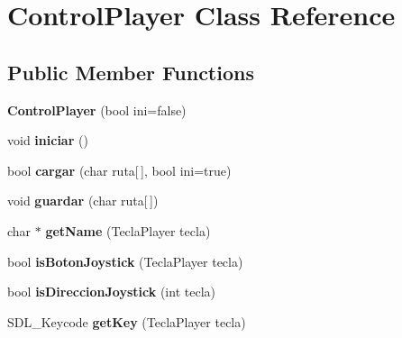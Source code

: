 \hypertarget{class_control_player}{}\section{Control\+Player Class Reference}
\label{class_control_player}
\subsection*{Public Member Functions}
\begin{DoxyCompactItemize}
\item 
{\bfseries Control\+Player} (bool ini=false)\hypertarget{class_control_player_ac3d7c8aa756e72ead84ca6f50f2821fa}{}\label{class_control_player_ac3d7c8aa756e72ead84ca6f50f2821fa}

\item 
void {\bfseries iniciar} ()\hypertarget{class_control_player_a0d545211221da7c7d908520f0f0a9b73}{}\label{class_control_player_a0d545211221da7c7d908520f0f0a9b73}

\item 
bool {\bfseries cargar} (char ruta\mbox{[}$\,$\mbox{]}, bool ini=true)\hypertarget{class_control_player_aaf328fa930e99fc4b3c6b3130c08e0a3}{}\label{class_control_player_aaf328fa930e99fc4b3c6b3130c08e0a3}

\item 
void {\bfseries guardar} (char ruta\mbox{[}$\,$\mbox{]})\hypertarget{class_control_player_a163aa08d30f28910bbd1c2598acfef1b}{}\label{class_control_player_a163aa08d30f28910bbd1c2598acfef1b}

\item 
char $\ast$ {\bfseries get\+Name} (Tecla\+Player tecla)\hypertarget{class_control_player_aa343efdce88d55cc0258f3a5e243a4a8}{}\label{class_control_player_aa343efdce88d55cc0258f3a5e243a4a8}

\item 
bool {\bfseries is\+Boton\+Joystick} (Tecla\+Player tecla)\hypertarget{class_control_player_a17f31058c30a2c352b1642dfed55c537}{}\label{class_control_player_a17f31058c30a2c352b1642dfed55c537}

\item 
bool {\bfseries is\+Direccion\+Joystick} (int tecla)\hypertarget{class_control_player_a78bffce443d2697df26c40a645aa024f}{}\label{class_control_player_a78bffce443d2697df26c40a645aa024f}

\item 
S\+D\+L\+\_\+\+Keycode {\bfseries get\+Key} (Tecla\+Player tecla)\hypertarget{class_control_player_a138c88280be358025ce7747d646b1513}{}\label{class_control_player_a138c88280be358025ce7747d646b1513}


\end{DoxyCompactItemize}
